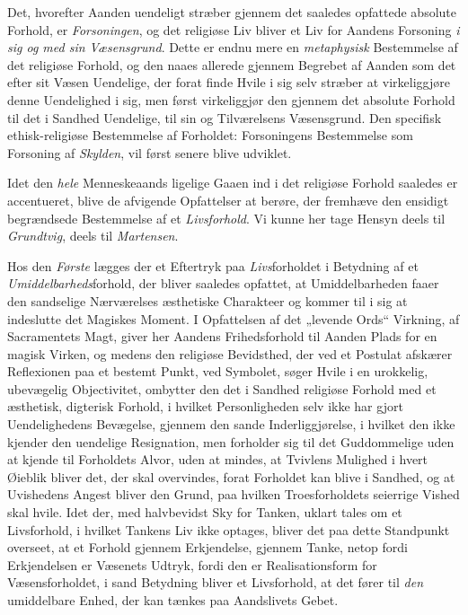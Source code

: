 Det, hvorefter Aanden uendeligt stræber gjennem det saaledes opfattede
absolute Forhold, er \emph{Forsoningen}, og det religiøse Liv bliver et Liv
for Aandens Forsoning \emph{i sig og med sin Væsensgrund}. Dette er endnu mere
en \emph{metaphysisk} Bestemmelse af det religiøse Forhold, og den naaes
allerede gjennem Begrebet af Aanden som det efter sit Væsen Uendelige, der
forat finde Hvile i sig selv stræber at virkeliggjøre denne Uendelighed i sig,
men først virkeliggjør den gjennem det absolute Forhold til det i Sandhed
Uendelige, til sin og Tilværelsens Væsensgrund. Den specifisk
ethisk-religiøse Bestemmelse af Forholdet: Forsoningens Bestemmelse som
Forsoning af \emph{Skylden}, vil først senere blive udviklet.

Idet den \emph{hele} Menneskeaands ligelige Gaaen ind i det religiøse Forhold
saaledes er accentueret, blive de afvigende Opfattelser at berøre, der
fremhæve den ensidigt begrændsede Bestemmelse af et \emph{Livsforhold}. Vi
kunne her tage Hensyn deels til \emph{Grundtvig}, deels til \emph{Martensen}.

Hos den \emph{Første} lægges der et Eftertryk paa \emph{Livs}forholdet i
Betydning af et \emph{Umiddelbarheds}forhold, der bliver saaledes opfattet, at
Umiddelbarheden faaer den sandselige Nærværelses æsthetiske Charakteer og
kommer til i sig at indeslutte det Magiskes Moment. I Opfattelsen af det
„levende Ords“ Virkning, af Sacramentets Magt, giver
 her Aandens Frihedsforhold til Aanden Plads for en magisk Virken, og medens
den religiøse Bevidsthed, der ved et Postulat afskærer Reflexionen paa et
bestemt Punkt, ved Symbolet, søger Hvile i en urokkelig, ubevægelig
Objectivitet, ombytter den det i Sandhed religiøse Forhold med et æsthetisk,
digterisk Forhold, i hvilket Personligheden selv ikke har gjort
Uendelighedens Bevægelse, gjennem den sande Inderliggjørelse, i hvilket den
ikke kjender den uendelige Resignation, men forholder sig til det
Guddommelige uden at kjende til Forholdets Alvor, uden at mindes, at Tvivlens
Mulighed i hvert Øieblik bliver det, der skal overvindes, forat Forholdet kan
blive i Sandhed, og at Uvishedens Angest bliver den Grund, paa hvilken
Troesforholdets seierrige Vished skal hvile. Idet der, med halvbevidst Sky
for Tanken, uklart tales om et Livsforhold, i hvilket Tankens Liv ikke
optages, bliver det paa dette Standpunkt overseet, at et Forhold gjennem
Erkjendelse, gjennem Tanke, netop fordi Erkjendelsen er Væsenets Udtryk, fordi
den er Realisationsform for Væsensforholdet, i sand Betydning bliver et
Livsforhold, at det fører til \emph{den} umiddelbare Enhed, der kan tænkes paa
Aandslivets Gebet.

